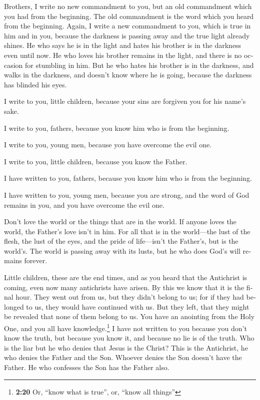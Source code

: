 \begin{paracol}{2}
\begin{otherlanguage}{english}
 Brothers, I write no new commandment to you, but an old
commandment which you had from the beginning. The old commandment is the
word which you heard from the beginning.  Again, I write a
new commandment to you, which is true in him and in you, because the
darkness is passing away and the true light already shines.
 He who says he is in the light and hates his brother is
in the darkness even until now.  He who loves his brother
remains in the light, and there is no occasion for stumbling in him.
 But he who hates his brother is in the darkness, and
walks in the darkness, and doesn't know where he is going, because the
darkness has blinded his eyes.

 I write to you, little children, because your sins are
forgiven you for his name's sake.

 I write to you, fathers, because you know him who is
from the beginning.

I write to you, young men, because you have overcome the evil one.

I write to you, little children, because you know the Father.

 I have written to you, fathers, because you know him who
is from the beginning.

I have written to you, young men, because you are strong, and the word
of God remains in you, and you have overcome the evil one.

 Don't love the world or the things that are in the
world. If anyone loves the world, the Father's love isn't in him.
 For all that is in the world---the lust of the flesh,
the lust of the eyes, and the pride of life---isn't the Father's, but is
the world's.  The world is passing away with its lusts,
but he who does God's will remains forever.

 Little children, these are the end times, and as you
heard that the Antichrist is coming, even now many antichrists have
arisen. By this we know that it is the final hour.  They
went out from us, but they didn't belong to us; for if they had belonged
to us, they would have continued with us. But they left, that they might
be revealed that none of them belong to us.  You have an
anointing from the Holy One, and you all have knowledge.\footnote{\textbf{2:20}
  Or, ``know what is true'', or, ``know all things''}  I
have not written to you because you don't know the truth, but because
you know it, and because no lie is of the truth.  Who is
the liar but he who denies that Jesus is the Christ? This is the
Antichrist, he who denies the Father and the Son. 
Whoever denies the Son doesn't have the Father. He who confesses the Son
has the Father also.


\end{otherlanguage}
\end{paracol}
